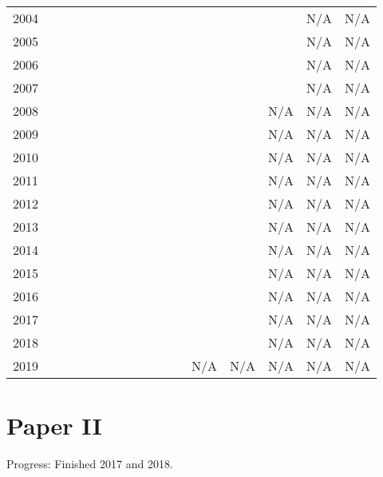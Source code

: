 \begin{center}
\begin{tabular}{c|cccccccccccccccc}
        2004 &   &   &   &   &   &   &   &   &   &    &    &     &     &     & N/A & N/A \\
        2005 &   &   &   &   &   &   &   &   &   &    &    &     &     &     & N/A & N/A \\
        2006 &   &   &   &   &   &   &   &   &   &    &    &     &     &     & N/A & N/A \\
        2007 &   &   &   &   &   &   &   &   &   &    &    &     &     &     & N/A & N/A \\
        2008 &   &   &   &   &   &   &   &   &   &    &    &     &     & N/A & N/A & N/A \\
        2009 &   &   &   &   &   &   &   &   &   &    &    &     &     & N/A & N/A & N/A \\
        2010 &   &   &   &   &   &   &   &   &   &    &    &     &     & N/A & N/A & N/A \\
        2011 &   &   &   &   &   &   &   &   &   &    &    &     &     & N/A & N/A & N/A \\
        2012 &   &   &   &   &   &   &   &   &   &    &    &     &     & N/A & N/A & N/A \\
        2013 &   &   &   &   &   &   &   &   &   &    &    &     &     & N/A & N/A & N/A \\
        2014 &   &   &   &   &   &   &   &   &   &    &    &     &     & N/A & N/A & N/A \\
        2015 &   &   &   &   &   &   &   &   &   &    &    &     &     & N/A & N/A & N/A \\
        2016 &   &   &   &   &   &   &   &   &   &    &    &     &     & N/A & N/A & N/A \\
        2017 &   &   &   &   &   &   &   &   &   &    &    &     &     & N/A & N/A & N/A \\
        2018 &   &   &   &   &   &   &   &   &   &    &    &     &     & N/A & N/A & N/A \\
        2019 &   &   &   &   &   &   &   &   &   &    &    & N/A & N/A & N/A & N/A & N/A
    \end{tabular}
\end{center}

\clearpage
\section*{Paper II}
Progress: Finished 2017 and 2018.

